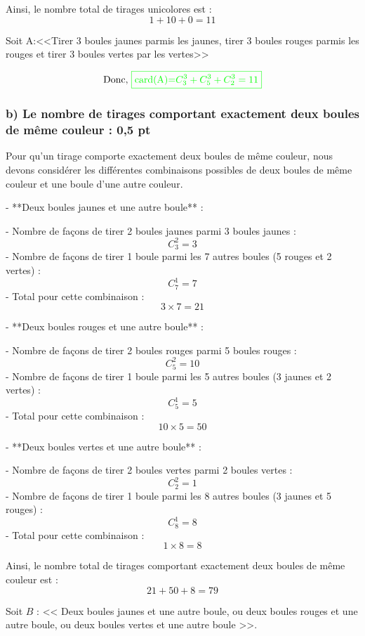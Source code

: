 \documentclass[12pt]{article}
\begin{document}
Ainsi, le nombre total de tirages unicolores est :
\[
1 + 10 + 0 = 11
\]
\textbf{\color{green}{Autrement dit :}}

Soit A:<<Tirer 3 boules jaunes parmis les jaunes, tirer 3 boules rouges parmis les rouges et tirer 3 boules vertes par les vertes>>

\[\text{Donc, }\color{green}{\boxed{\text{card(A)=}  C_{3}^{3} + C_{5}^{3} + C_{2}^{3}=11}}\]
\subsubsection*{b) Le nombre de tirages comportant exactement deux boules de même couleur : \textbf{0,5 pt}}

Pour qu'un tirage comporte exactement deux boules de même couleur, nous devons considérer les différentes combinaisons possibles de deux boules de même couleur et une boule d'une autre couleur.

- **Deux boules jaunes et une autre boule** :

  - Nombre de façons de tirer 2 boules jaunes parmi 3 boules jaunes :
    \[
    C_{3}^{2} = 3
    \]
  - Nombre de façons de tirer 1 boule parmi les 7 autres boules (5 rouges et 2 vertes) :
    \[
    C_{7}^{1} = 7
    \]
  - Total pour cette combinaison :
    \[
    3 \times 7 = 21
    \]

- **Deux boules rouges et une autre boule** :

  - Nombre de façons de tirer 2 boules rouges parmi 5 boules rouges :
    \[
    C_{5}^{2} = 10
    \]
  - Nombre de façons de tirer 1 boule parmi les 5 autres boules (3 jaunes et 2 vertes) :
    \[
    C_{5}^{1} = 5
    \]
  - Total pour cette combinaison :
    \[
    10 \times 5 = 50
    \]

- **Deux boules vertes et une autre boule** :

  - Nombre de façons de tirer 2 boules vertes parmi 2 boules vertes :
    \[
    C_{2}^{2} = 1
    \]
  - Nombre de façons de tirer 1 boule parmi les 8 autres boules (3 jaunes et 5 rouges) :
    \[
    C_{8}^{1} = 8
    \]
  - Total pour cette combinaison :
    \[
    1 \times 8 = 8
    \]

Ainsi, le nombre total de tirages comportant exactement deux boules de même couleur est :
\[
21 + 50 + 8 = 79
\]
\textbf{\color{green}{Autrement dit :}}

Soit $B$ : << Deux boules jaunes et une autre boule, ou deux boules rouges et une autre boule, ou deux boules vertes et une autre boule >>.
\end{document}
